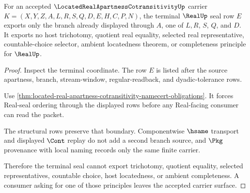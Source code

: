 \begin{theorem}
\label{thm:located-real-apartness-cotransitivity-real-seal-nonescape}
For an accepted $\LocatedRealApartnessCotransitivityUp$ carrier $K=(X,Y,Z,A,L,R,S,Q,D,E,H,C,P,N)$, the terminal $\RealUp$ seal row $E$ exports only the branch already displayed through $A$, one of $L,R$, $S$, $Q$, and $D$. It exports no host trichotomy, quotient real equality, selected real representative, countable-choice selector, ambient locatedness theorem, or completeness principle for $\RealUp$.
\end{theorem}
\begin{proof}
Inspect the terminal coordinate. The row $E$ is listed after the source apartness, branch, stream-window, regular-readback, and dyadic-tolerance rows.

Use \autoref{thm:located-real-apartness-cotransitivity-namecert-obligations}. It forces Real-seal ordering through the displayed rows before any Real-facing consumer can read the packet.

The structural rows preserve that boundary. Componentwise $\hsame$ transport and displayed $\Cont$ replay do not add a second branch source, and $\Pkg$ provenance with local naming records only the same finite carrier.

Therefore the terminal seal cannot export trichotomy, quotient equality, selected representatives, countable choice, host locatedness, or ambient completeness. A consumer asking for one of those principles leaves the accepted carrier surface.
\end{proof}



